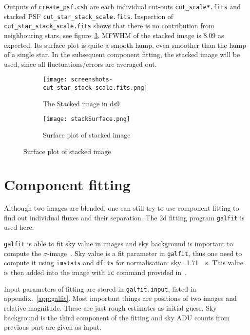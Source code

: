 Outputs of \verb|create_psf.csh| are each individual cut-outs \verb|cut_scale*.fits| and stacked PSF \verb|cut_star_stack_scale.fits|. Inspection of \verb|cut_star_stack_scale.fits| shows that there is no contribution from neighbouring stars, see figure~\ref{fig:stackSurface}. MFWHM of the stacked image is \num{8.09} as expected. Its surface plot is quite a smooth hump, even smoother than the hump of a single star. In the subsequent component fitting, the stacked image will be used, since all fluctuations/errors are averaged out.
\begin{figure}[ht]
	\begin{subfigure}[t]{0.5\textwidth}
	\begin{center}
		\texttt{[image: screenshots-cut\_star\_stack\_scale.fits.png]}
	\end{center}
	\caption{The Stacked image in ds9}%
	\label{fig:stackScrenn}
	\end{subfigure}%
	\centering
	\begin{subfigure}[t]{0.5\textwidth}
	\begin{center}
	\texttt{[image: stackSurface.png]}
	\end{center}
	\caption{Surface plot of stacked image}%
	\label{fig:stackSurface}
	\end{subfigure}
\end{figure}

\clearpage
\section{Component fitting}
Although two images are blended, one can still try to use component fitting to find out individual fluxes and their separation. The 2d fitting program \verb|galfit| is used here.

\verb|galfit| is able to fit sky value in images and sky background is important to compute the $\sigma$-image~\cite{galfitManual}. Sky value is a fit parameter in \verb|galfit|, thus one need to compute it using \verb|imstats| and \verb|dfits| for normalisation: sky=\SI{1.71}{\per\s}. This value is then added into the image with \verb|ic| command provided in~\cite{manual}.

Input parameters of fitting are stored in \verb|galfit.input|, listed in appendix.~\ref{app:galfit}. Most important things are positions of two images and relative magnitude. These are just rough estimates as initial guess. Sky background is the third component of the fitting and sky ADU counts from previous part are given as input.

